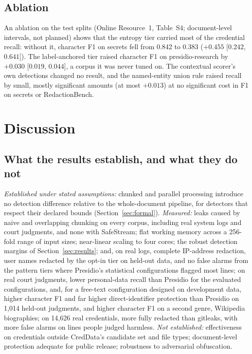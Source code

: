 \documentclass[pdflatex,sn-mathphys-num]{sn-jnl}
\theoremstyle{thmstyleone}
\theoremstyle{thmstylethree}
\begin{document}
\subsection{Ablation}\label{sec:ablation}
An ablation on the test splits (Online Resource~1, Table~S4; document-level intervals, not planned) shows that the entropy tier carried most of the credential recall: without it, character F1 on secrets fell from 0.842 to 0.383 ($+0.455$ [$0.242$, $0.641$]). The label-anchored tier raised character F1 on presidio-research by $+0.030$ [$0.019$, $0.044$], a corpus it was never tuned on. The contextual scorer's own detections changed no result, and the named-entity union rule raised recall by small, mostly significant amounts (at most $+0.013$) at no significant cost in F1 on secrets or RedactionBench.

\section{Discussion}\label{sec:discussion}

\subsection{What the results establish, and what they do not}
\emph{Established under stated assumptions:} chunked and parallel processing introduce no detection difference relative to the whole-document pipeline, for detectors that respect their declared bounds (Section~\ref{sec:formal}). \emph{Measured:} leaks caused by naive and overlapping chunking on every corpus, including real system logs and court judgments, and none with SafeStream; flat working memory across a 256-fold range of input sizes; near-linear scaling to four cores; the robust detection margins of Section~\ref{sec:results}; and, on real logs, complete IP-address redaction, user names redacted by the opt-in tier on held-out data, and no false alarms from the pattern tiers where Presidio's statistical configurations flagged most lines; on real court judgments, lower personal-data recall than Presidio for the evaluated configurations, and, for a free-text configuration designed on development data, higher character F1 and far higher direct-identifier protection than Presidio on 1,014 held-out judgments, and higher character F1 on a second genre, Wikipedia biographies; on 14,626 real credentials, more fully redacted than gitleaks, with more false alarms on lines people judged harmless. \emph{Not established:} effectiveness on credentials outside CredData's candidate set and file types; document-level protection adequate for public release; robustness to adversarial obfuscation.
\end{document}

